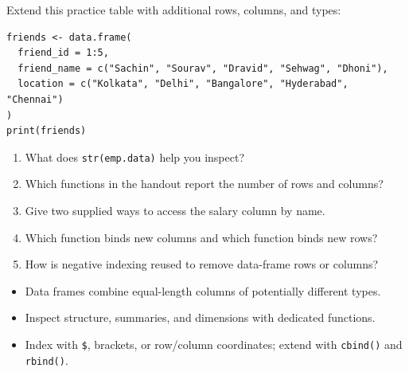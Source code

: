 Extend this practice table with additional rows, columns, and types:

\begin{lstlisting}[style=dsr]
friends <- data.frame(
  friend_id = 1:5,
  friend_name = c("Sachin", "Sourav", "Dravid", "Sehwag", "Dhoni"),
  location = c("Kolkata", "Delhi", "Bangalore", "Hyderabad", "Chennai")
)
print(friends)
\end{lstlisting}

\begin{quickcheck}
\begin{enumerate}
  \item What does \texttt{str(emp.data)} help you inspect?
  \item Which functions in the handout report the number of rows and columns?
  \item Give two supplied ways to access the salary column by name.
  \item Which function binds new columns and which function binds new rows?
  \item How is negative indexing reused to remove data-frame rows or columns?
\end{enumerate}
\end{quickcheck}

\begin{chapterrecap}
\begin{itemize}
  \item Data frames combine equal-length columns of potentially different types.
  \item Inspect structure, summaries, and dimensions with dedicated functions.
  \item Index with \texttt{\$}, brackets, or row/column coordinates; extend with \texttt{cbind()} and \texttt{rbind()}.
\end{itemize}
\end{chapterrecap}
